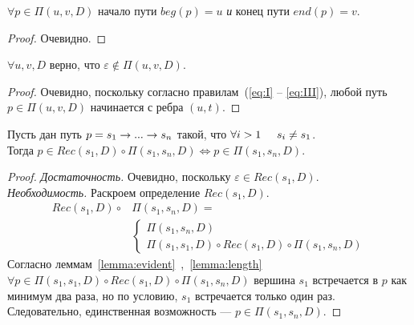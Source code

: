 \begin{lemma}
\label{lemma:evident}
$\forall p \in \Pi(u,v,D)$ начало пути $beg(p) = u$ \emph{и} конец пути $end(p) = v$.
\end{lemma}
\begin{proof}
Очевидно.
\end{proof}

\begin{lemma}
\label{lemma:length}
$\forall u,v,D$ верно, что $\varepsilon \notin \Pi(u,v,D)$.
\end{lemma}
\begin{proof}
Очевидно, поскольку согласно правилам~(\ref{eq:I} -- \ref{eq:III}), любой путь $p \in \Pi(u,v,D)$ начинается с ребра $(u,t)$.
\end{proof}

\begin{lemma}
\label{lemma:reduction}
Пусть дан путь $p = s_1 \rightarrow ... \rightarrow s_n$ такой, что $\forall i > 1 \hspace{5mm} s_i \neq s_1$. \\
Тогда $p \in Rec(s_1,D) \circ \Pi(s_1, s_n, D) \iff p \in \Pi(s_1,s_n,D)$.
\end{lemma}

\begin{proof}
\emph{Достаточность.} Очевидно, поскольку $\varepsilon \in Rec(s_1,D)$. \\
\emph{Необходимость.} Раскроем определение $Rec(s_1,D)$.\\
\begin{equation}
    \begin{aligned}
    Rec(s_1,D) \circ & \Pi(s_1,s_n,D) = \\ 
                     & \begin{cases} 
            \Pi(s_1,s_n,D) \\
            \Pi(s_1,s_1,D) \circ Rec(s_1,D) \circ \Pi(s_1, s_n,D)
            \end{cases}
    \end{aligned}
\end{equation}
Согласно леммам~\ref{lemma:evident}~,~\ref{lemma:length} $\forall p \in \Pi(s_1, s_1,D) \circ Rec(s_1,D) \circ \Pi(s_1, s_n,D)$
вершина $s_1$ встречается в $p$ как минимум два раза, но по условию, $s_1$ встречается только один раз.
Следовательно, единственная возможность --- $p \in \Pi(s_1,s_n,D)$.
\end{proof}

